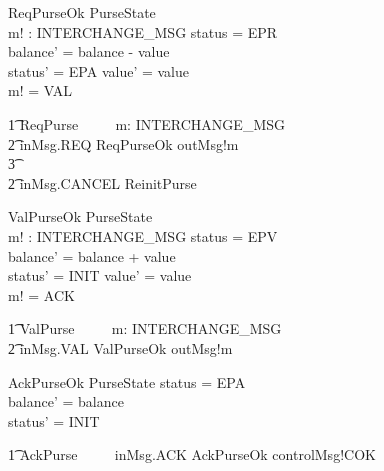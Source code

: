 \documentclass{article}
\begin{document}
\begin{schema}{ReqPurseOk}
     \Delta PurseState \\
     m! : INTERCHANGE\_MSG
\where
      status = EPR \\      
      balance' = balance - value \\
      status' = EPA \land value' = value \\
      m! = VAL       
\end{schema}

\begin{circusaction}
    \t1 ReqPurse ~~\circdef~~  \circvar m: INTERCHANGE\_MSG \circspot \\
		\t2 inMsg.REQ \then  \lschexpract ReqPurseOk \rschexpract \circseq outMsg!m \then \Skip \\
				\t3 \extchoice \\
		\t2 inMsg.CANCEL \then \lschexpract ReinitPurse \rschexpract 
\end{circusaction}

\begin{schema}{ValPurseOk}
     \Delta PurseState \\
     m! : INTERCHANGE\_MSG
\where
      status = EPV \\      
      balance' = balance + value \\
      status' = INIT \land value' = value \\
      m! = ACK       
\end{schema}

\begin{circusaction}
    \t1 ValPurse ~~\circdef~~  \circvar m: INTERCHANGE\_MSG \circspot \\
		\t2 inMsg.VAL \then  \lschexpract ValPurseOk \rschexpract \circseq outMsg!m \then \Skip 
\end{circusaction}

\begin{schema}{AckPurseOk}
     \Delta PurseState 
\where
      status = EPA \\      
      balance' = balance \\ 
      status' = INIT
\end{schema}

\begin{circusaction}
    \t1 AckPurse ~~\circdef~~  inMsg.ACK \then  \lschexpract AckPurseOk \rschexpract \circseq controlMsg!COK \then \Skip 
\end{circusaction}
\end{document}
